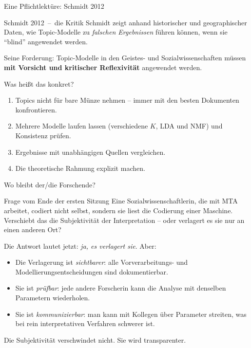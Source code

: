 \documentclass[aspectratio=169,11pt]{beamer}
\newcommand{\mdash}{\,{\monodash–}\,}
\let\oldemph\emph
\renewcommand{\emph}[1]{{\color{solCyan}\oldemph{#1}}}
\let\oldtextbf\textbf
\renewcommand{\textbf}[1]{{\color{solBase3}\oldtextbf{#1}}}
\begin{document}
\begin{frame}{Eine Pflichtlektüre: Schmidt 2012}

  \begin{block}{Schmidt 2012 \mdash{} die Kritik}
    Schmidt zeigt anhand historischer und geographischer Daten, wie
    Topic-Modelle zu \emph{falschen Ergebnissen} führen können,
    wenn sie \enquote{blind} angewendet werden.
  \end{block}

  \vfill
  Seine Forderung: Topic-Modelle in den Geistes- und Sozialwissenschaften
  müssen \textbf{mit Vorsicht und kritischer Reflexivität} angewendet
  werden.

  \vfill
  Was heißt das konkret?
  \begin{enumerate}
    \item Topics nicht für bare Münze nehmen – immer mit den
          besten Dokumenten konfrontieren.
    \item Mehrere Modelle laufen lassen (verschiedene $K$, LDA und
          NMF) und Konsistenz prüfen.
    \item Ergebnisse mit unabhängigen Quellen vergleichen.
    \item Die theoretische Rahmung explizit machen.
  \end{enumerate}

\end{frame}

\begin{frame}{Wo bleibt der/die Forschende?}

  \begin{block}{Frage vom Ende der ersten Sitzung}
    Eine Sozialwissenschaftlerin, die mit MTA arbeitet, codiert nicht
    selbst, sondern sie liest die Codierung einer Maschine. Verschiebt
    das die Subjektivität der Interpretation – oder verlagert es sie
    nur an einen anderen Ort?
  \end{block}

  \vfill
  Die Antwort lautet jetzt: \emph{ja, es verlagert sie}. Aber:

  \vfill
  \begin{itemize}
    \item Die Verlagerung ist \emph{sichtbarer}: alle Vorverarbeitungs- und
          Modellierungsentscheidungen sind dokumentierbar.
    \vfill
    \item Sie ist \emph{prüfbar}: jede andere Forscherin kann die
          Analyse mit denselben Parametern wiederholen.
    \vfill
    \item Sie ist \emph{kommunizierbar}: man kann mit Kollegen über
          Parameter streiten, was bei rein interpretativen Verfahren
          schwerer ist.
  \end{itemize}

  \vfill
  Die Subjektivität verschwindet nicht. Sie wird transparenter.

\end{frame}
\end{document}
